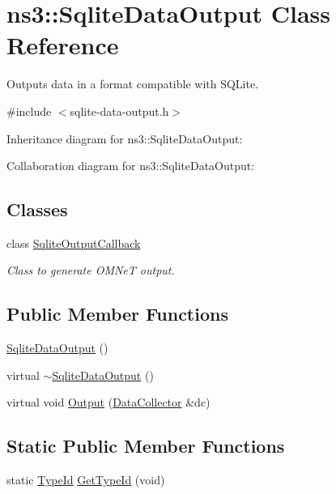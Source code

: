 \hypertarget{classns3_1_1SqliteDataOutput}{}\section{ns3\+:\+:Sqlite\+Data\+Output Class Reference}
\label{classns3_1_1SqliteDataOutput}


Outputs data in a format compatible with S\+Q\+Lite.  




{\ttfamily \#include $<$sqlite-\/data-\/output.\+h$>$}



Inheritance diagram for ns3\+:\+:Sqlite\+Data\+Output\+:


Collaboration diagram for ns3\+:\+:Sqlite\+Data\+Output\+:
\subsection*{Classes}
\begin{DoxyCompactItemize}
\item 
class \hyperlink{classns3_1_1SqliteDataOutput_1_1SqliteOutputCallback}{Sqlite\+Output\+Callback}
\begin{DoxyCompactList}\small\item\em Class to generate O\+M\+NeT output. \end{DoxyCompactList}\end{DoxyCompactItemize}
\subsection*{Public Member Functions}
\begin{DoxyCompactItemize}
\item 
\hyperlink{classns3_1_1SqliteDataOutput_a67a08c7303347e8eb16b990c1a8881a7}{Sqlite\+Data\+Output} ()
\item 
virtual \hyperlink{classns3_1_1SqliteDataOutput_a84150ca53dcec63ba7af04afadeb2ca2}{$\sim$\+Sqlite\+Data\+Output} ()
\item 
virtual void \hyperlink{classns3_1_1SqliteDataOutput_a24e78d7e0c5eda7cf75a131b51fb5471}{Output} (\hyperlink{classns3_1_1DataCollector}{Data\+Collector} \&dc)
\end{DoxyCompactItemize}
\subsection*{Static Public Member Functions}
\begin{DoxyCompactItemize}
\item 
static \hyperlink{classns3_1_1TypeId}{Type\+Id} \hyperlink{classns3_1_1SqliteDataOutput_a33a5358f7bf0c45e44d216484484b245}{Get\+Type\+Id} (void)
\end{DoxyCompactItemize}
